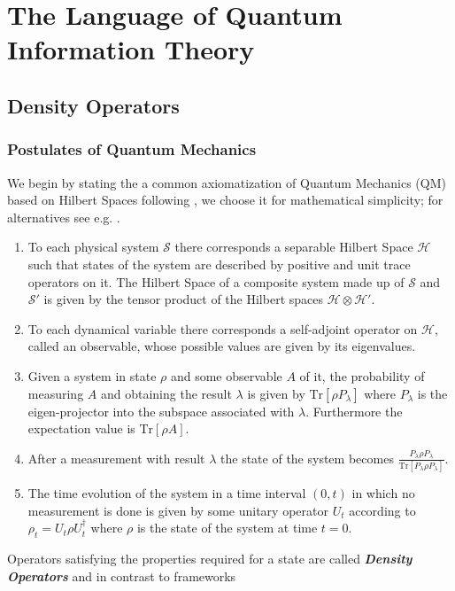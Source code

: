 \chapter{The Language of Quantum Information Theory}
\section{Density Operators}
\subsection{Postulates of Quantum Mechanics}
We begin by stating the a common axiomatization of Quantum Mechanics (QM) based on Hilbert Spaces following \cite{ballentine_quantum_2014}, we choose it for mathematical simplicity; for alternatives see e.g. \cite{reyes-lega_aspects_2015}.
\begin{enumerate}
        \item To each physical system $\mathcal{S}$ there corresponds a separable Hilbert Space $\mathcal{H}$ such that states of the system are described by positive and unit trace operators on it. The Hilbert Space of a composite system made up of $\mathcal{S}$ and $\mathcal{S}'$
        is given by the tensor product of the Hilbert spaces $\mathcal{H}\otimes\mathcal{H}'$.
        \item To each dynamical variable there corresponds a self-adjoint operator on $\mathcal{H}$, called an observable, whose possible
        values are given by its eigenvalues.
        \item Given a system in  state $\rho$ and some observable $A$ of it, the probability of measuring $A$ and obtaining the result
        $\lambda$ is given by $\mathrm{Tr}[\rho P_{\lambda}]$ where $P_{\lambda}$ is the eigen-projector into the subspace associated with
        $\lambda$. Furthermore the expectation value is $\mathrm{Tr}[\rho A]$.
        \item After a measurement with result $\lambda$ the state of the system becomes $\frac{P_{\lambda}\rho P_{\lambda}}{\mathrm{Tr}[P_{\lambda}\rho
        P_{\lambda}]}$.
        \item The time evolution of the system in a time interval $(0,t)$ in which no measurement is done is given by some unitary operator
        $U_{t}$ according to $\rho_{t}=U_{t}\rho U_{t}^{\dagger}$ where $\rho$ is the state of the system at time $t=0$.
\end{enumerate}
Operators satisfying the properties required for a state are called \textit{\textbf{Density Operators}} and in contrast to frameworks
